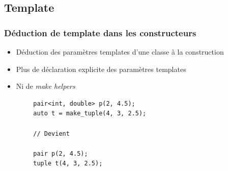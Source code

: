 \documentclass[C++.tex]{subfiles}
\begin{document}
\subsection*{Template}
\begin{frame}[fragile]
	\frametitle{Déduction de template dans les constructeurs}
	\begin{itemize}
		\item Déduction des paramètres templates d'une classe à la construction
		\item Plus de déclaration explicite des paramètres templates
		\item Ni de \textit{make helpers}
	\end{itemize}


	\begin{verbatim}
		pair<int, double> p(2, 4.5);
		auto t = make_tuple(4, 3, 2.5);

		// Devient

		pair p(2, 4.5);
		tuple t(4, 3, 2.5);
	\end{verbatim}

\end{frame}
\end{document}
